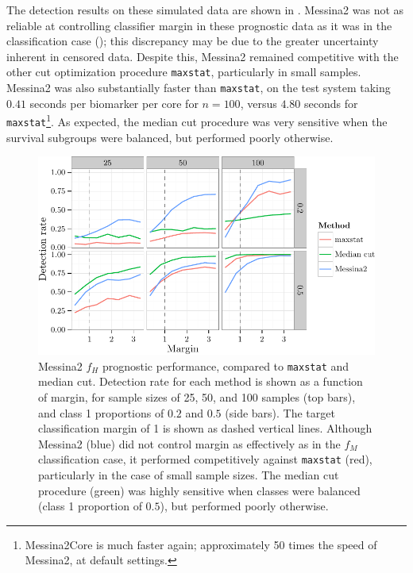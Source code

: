 \documentclass[dissertation.tex]{subfiles}
\begin{document}
The detection results on these simulated data are shown in .  Messina2 was not as reliable at controlling classifier margin in these prognostic data as it was in the classification case (); this discrepancy may be due to the greater uncertainty inherent in censored data.  Despite this, Messina2 remained competitive with the other cut optimization procedure \texttt{maxstat}, particularly in small samples.  Messina2 was also substantially faster than \texttt{maxstat}, on the test system taking $0.41$ seconds per biomarker per core for $n = 100$, versus $4.80$ seconds for \texttt{maxstat}\footnote{Messina2Core is much faster again; approximately 50 times the speed of Messina2, at default settings.}.  As expected, the median cut procedure was very sensitive when the survival subgroups were balanced, but performed poorly otherwise.

\begin{figure}[!htbp]
\centering
\includegraphics[width=\linewidth]{analysis/messina/figure/06-E2B-E2B-plots-1}
\caption[Messina2 prognostic performance compared to alternative methods]{Messina2 $f_H$ prognostic performance, compared to \texttt{maxstat} and median cut.  Detection rate for each method is shown as a function of margin, for sample sizes of 25, 50, and 100 samples (top bars), and class 1 proportions of $0.2$ and $0.5$ (side bars).  The target classification margin of 1 is shown as dashed vertical lines.  Although Messina2 (blue) did not control margin as effectively as in the $f_M$ classification case, it performed competitively against \texttt{maxstat} (red), particularly in the case of small sample sizes.  The median cut procedure (green) was highly sensitive when classes were balanced (class 1 proportion of $0.5$), but performed poorly otherwise.}\label{fig:mess-vs-maxstat}
\end{figure}
\end{document}
